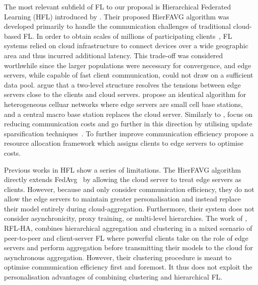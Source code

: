The most relevant subfield of FL to our proposal is Hierarchical Federated Learning (HFL) introduced by \citet{Client-Edge-CloudHierFL}. Their proposed HierFAVG algorithm was developed primarily to handle the communication challenges of traditional cloud-based FL\@. In order to obtain scales of millions of participating clients~\citep{GoogleKeyboard, ScaleSystemDesign}, FL systems relied on cloud infrastructure to connect devices over a wide geographic area and thus incurred additional latency. This trade-off was considered worthwhile since the larger populations were necessary for convergence, and edge servers, while capable of fast client communication, could not draw on a sufficient data pool. \citet{Client-Edge-CloudHierFL} argue that a two-level structure resolves the tensions between edge servers close to the clients and cloud servers. \citet{Hier_Het_Cellular} propose an identical algorithm for heterogeneous celluar networks where edge servers are small cell base stations, and a central macro base station replaces the cloud server. Similarly to \citet{Client-Edge-CloudHierFL}, \citet{Hier_Het_Cellular} focus on reducing communication costs and go further in this direction by utilising update sparsification techniques~\citep{DeepGradientCompressin,CommCompressionDecent}. To further improve communication efficiency \citet{HFELJointEdgeResource} propose a resource allocation framework which assigns clients to edge servers to optimise costs.


Previous works in HFL show a series of limitations. The HierFAVG algorithm directly extends FedAvg~\citep{FedAvg} by allowing the cloud server to treat edge servers as clients. However, because \citet{Client-Edge-CloudHierFL} and \citet{Hier_Het_Cellular} only consider communication efficiency, they do not allow the edge servers to maintain greater personalisation and instead replace their model entirely during cloud-aggregation. Furthermore, their system does not consider asynchronicity, proxy training, or multi-level hierarchies. The work of \citet{ResourceEfficientHierAgg}, RFL-HA, combines hierarchical aggregation and clustering in a mixed scenario of peer-to-peer and client-server FL where powerful clients take on the role of edge servers and perform aggregation before transmitting their models to the cloud for asynchronous aggregation. However, their clustering procedure is meant to optimise communication efficiency first and foremost. It thus does not exploit the personalisation advantages of combining clustering and hierarchical FL\@.

